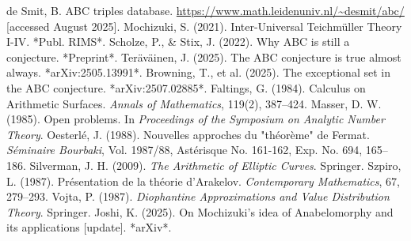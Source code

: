 \documentclass[11pt,a4paper]{article}
\begin{document}
\begin{thebibliography}{30}
 de Smit, B. ABC triples database. \url{https://www.math.leidenuniv.nl/~desmit/abc/} [accessed August 2025].
 Mochizuki, S. (2021). Inter-Universal Teichmüller Theory I-IV. *Publ. RIMS*.
 Scholze, P., \& Stix, J. (2022). Why ABC is still a conjecture. *Preprint*.
 Teräväinen, J. (2025). The ABC conjecture is true almost always. *arXiv:2505.13991*.
 Browning, T., et al. (2025). The exceptional set in the ABC conjecture. *arXiv:2507.02885*.
 Faltings, G. (1984). Calculus on Arithmetic Surfaces. \textit{Annals of Mathematics}, 119(2), 387--424.
 Masser, D. W. (1985). Open problems. In \textit{Proceedings of the Symposium on Analytic Number Theory}.
 Oesterlé, J. (1988). Nouvelles approches du "théorème" de Fermat. \textit{Séminaire Bourbaki}, Vol. 1987/88, Astérisque No. 161-162, Exp. No. 694, 165--186.
 Silverman, J. H. (2009). \textit{The Arithmetic of Elliptic Curves}. Springer.
 Szpiro, L. (1987). Présentation de la théorie d'Arakelov. \textit{Contemporary Mathematics}, 67, 279--293.
 Vojta, P. (1987). \textit{Diophantine Approximations and Value Distribution Theory}. Springer.
 Joshi, K. (2025). On Mochizuki's idea of Anabelomorphy and its applications [update]. *arXiv*.
\end{thebibliography}
\end{document}
